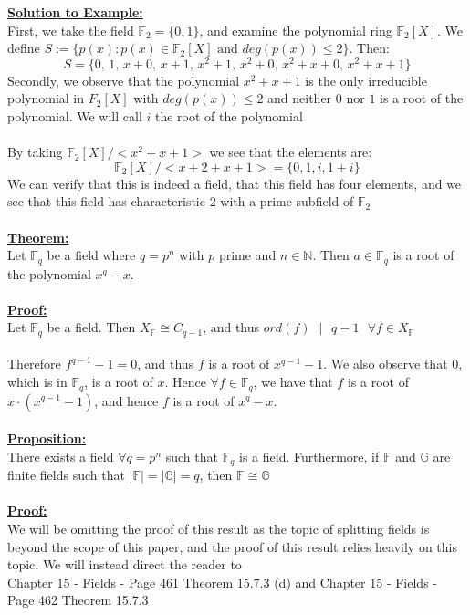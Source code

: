 \documentclass[11pt]{article}
\theoremstyle{plain}
\theoremstyle{definition}
\begin{document}
\textbf{\underline{Solution to Example:}}\\
First, we take the field $\mathbb{F}_2 = \{0,1\}$, and examine the polynomial ring $\mathbb{F}_{2}[X]$. We define $S:= \{p(x) : p(x) \in \mathbb{F}_2 [X] \text{ and } deg(p(x)) \leq 2\} $. Then:
\begin{equation*}
S= \{0\text{, }1\text{, }x + 0\text{, }x + 1\text{, }x^2 + 1\text{, }x^2 + 0\text{, }x^2 + x + 0\text{, } x^2 + x + 1\}
\end{equation*}
Secondly, we observe that the polynomial $x^2 + x + 1$ is the only irreducible polynomial in $F_2 [X]$ with $deg(p(x)) \leq 2$ and neither $0$ nor $1$ is a root of the polynomial. We will call $i$ the root of the polynomial \\
\\
By taking $\mathbb{F}_{2}[X] / <x^2 + x + 1>$ we see that the elements are:
\begin{equation*}
\mathbb{F}_{2}[X] /<x+2 + x + 1> = \{ 0, 1, i, 1+i \}
\end{equation*}
We can verify that this is indeed a field, that this field has four elements, and we see that this field has characteristic $2$ with a prime subfield of $\mathbb{F}_2$\\
\\
\textbf{\underline{Theorem:}}\\
Let $\mathbb{F}_q$ be a field where $q=p^n$ with $p$ prime and $n \in \mathbb{N}$. Then $a \in \mathbb{F}_q$ is a root of the polynomial $x^q - x$.\\
\\
\textbf{\underline{Proof:}}\\
Let $\mathbb{F}_q$ be a field. Then $X_\mathbb{F} \cong C_{q-1}$, and thus $ord(f)\text{ }|\text{ }q-1 \text{ } \forall f \in X_\mathbb{F}$\\
\\
Therefore $f^{q-1} -1 = 0$, and thus $f$ is a root of $x^{q-1} -1$. We also observe that $0$, which is in $\mathbb{F}_q$, is a root of $x$. Hence $\forall f \in \mathbb{F}_q$, we have that $f$ is a root of $x\cdot (x^{q-1} -1)$, and hence $f$ is a root of $x^q - x$.\\
\\
\textbf{\underline{Proposition:}} \\
There exists a field $\forall q=p^n$ such that $\mathbb{F}_q$ is a field. Furthermore, if $\mathbb{F}$ and $\mathbb{G}$ are finite fields such that $| \mathbb{F}| = |\mathbb{G}| = q$, then $\mathbb{F} \cong \mathbb{G}$\\
\\
\textbf{\underline{Proof:}}\\
We will be omitting the proof of this result as the topic of splitting fields is beyond the scope of this paper, and the proof of this result relies heavily on this topic. We will instead direct the reader to
\\
\cite{Algebra} Chapter 15 - Fields - Page 461 Theorem 15.7.3 (d) and \cite{Algebra} Chapter 15 - Fields - Page 462 Theorem 15.7.3\\
\\
\pagebreak
\end{document}
